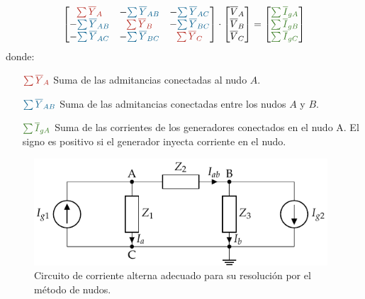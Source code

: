 \begin{equation*}
  \begin{bmatrix}
    {\color{BrickRed}\sum \overline{Y}_A} & - {\color{MidnightBlue}\sum \overline{Y}_{AB}} & - {\color{MidnightBlue}\sum \overline{Y}_{AC}}\\
    -{\color{MidnightBlue}\sum \overline{Y}_{AB}} & {\color{BrickRed}\sum \overline{Y}_B} & -{\color{MidnightBlue}\sum \overline{Y}_{BC}}\\
    -{\color{MidnightBlue}\sum \overline{Y}_{AC}} & -{\color{MidnightBlue}\sum \overline{Y}_{BC}} & {\color{BrickRed}\sum \overline{Y}_C}
  \end{bmatrix} \cdot%
  \begin{bmatrix}
    \overline{V}_A\\
    \overline{V}_B\\
    \overline{V}_C
  \end{bmatrix} = %
  \begin{bmatrix}
    {\color{OliveGreen}\sum \overline{I}_{gA}}\\
    {\color{OliveGreen}\sum \overline{I}_{gB}}\\
    {\color{OliveGreen}\sum \overline{I}_{gC}}
  \end{bmatrix}
\end{equation*}
donde:
\begin{itemize}
\item[{\({\color{BrickRed}\sum \overline{Y}_A}\)}] Suma de las admitancias conectadas al nudo \(A\).
\item[{\({\color{MidnightBlue}\sum \overline{Y}_{AB}}\)}] Suma de las admitancias conectadas entre los nudos \(A\) y \(B\).
\item[{\({\color{OliveGreen}\sum \overline{I}_{gA}}\)}] Suma de las corrientes de los generadores conectados en el nudo A. El signo es positivo si el generador inyecta corriente en el nudo.
\end{itemize}

\begin{figure}[H]
  \centering
  \includegraphics[height=4cm]{../figs/nudosAC.pdf}
  \caption{Circuito de corriente alterna adecuado para su resolución por el método de nudos.}
  \label{fig:nudos-alterna}
\end{figure}

